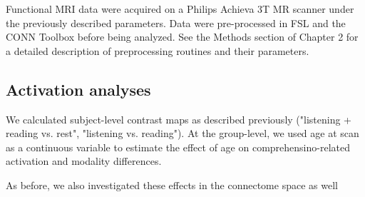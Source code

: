 Functional MRI data were acquired on a Philips Achieva 3T MR scanner under the previously described parameters. Data were pre-processed in FSL and the CONN Toolbox before being analyzed. See the Methods section of Chapter 2 for a detailed description of preprocessing routines and their parameters.

\subsection{Activation analyses}

We calculated subject-level contrast maps as described previously ("listening + reading vs. rest", "listening vs. reading"). At the group-level, we used age at scan as a continuous variable to estimate the effect of age on comprehensino-related activation and modality differences.

As before, we also investigated these effects in the connectome space as well 